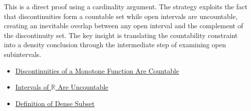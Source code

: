 \begin{remark*}
This is a direct proof using a cardinality argument. The strategy exploits the fact that discontinuities form a countable set while open intervals are uncountable, creating an inevitable overlap between any open interval and the complement of the discontinuity set. The key insight is translating the countability constraint into a density conclusion through the intermediate step of examining open subintervals.
\end{remark*}

\begin{dependencies}
\begin{itemize}
  \item \hyperref[thm:monotone-discontinuities-countable]{Discontinuities of a Monotone Function Are Countable}
  \item \hyperref[thm:intervals-are-uncountable]{Intervals of $\mathbb{R}$ Are Uncountable}
  \item \hyperref[def:dense-subset]{Definition of Dense Subset}
\end{itemize}
\end{dependencies}

\clearpage
